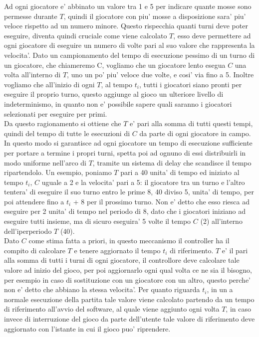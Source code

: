 Ad ogni giocatore e’ abbinato un valore tra 1 e 5 per indicare quante mosse sono permesse durante $T$, quindi il giocatore con piu’ mosse a disposizione sara’ piu’ veloce rispetto ad un numero minore. Questo rispecchia quanti turni deve poter eseguire, diventa quindi cruciale come viene calcolato $T$, esso deve permettere ad ogni giocatore di eseguire un numero di volte pari al suo valore che rappresenta la velocita’. Dato un campionamento del tempo di esecuzione pessimo di un turno di un giocatore, che chiameremo C, vogliamo che un giocatore lento esegua $C$ una volta all’interno di $T$, uno un po’ piu’ veloce due volte, e cosi’ via fino a 5. Inoltre vogliamo che all’inizio di ogni $T$, al tempo $t_i$, tutti i giocatori siano pronti per eseguire il proprio turno, questo aggiunge al gioco un ulteriore livello di indeterminismo, in quanto non e’ possibile sapere quali saranno i giocatori selezionati per eseguire per primi.\\

Da questo ragionamento si ottiene che $T$ e’ pari alla somma di tutti questi tempi, quindi del tempo di tutte le esecuzioni di $C$ da parte di ogni giocatore in campo. In questo modo si garantisce ad ogni giocatore un tempo di esecuzione sufficiente per portare a termine i propri turni, spetta poi ad ognuno di essi distribuirli in modo uniforme nell’arco di $T$, tramite un sistema di delay che scandisce il tempo ripartendolo. Un esempio, poniamo $T$ pari a 40 unita’ di tempo ed iniziato al tempo $t_i$, $C$ uguale a 2 e la velocita’ pari a 5: il giocatore tra un turno e l’altro tentera’ di eseguire il suo turno entro le prime 8, 40 diviso 5, unita’ di tempo, per poi attendere fino a $t_i$ + 8 per il prossimo turno. Non e’ detto che esso riesca ad eseguire per 2 unita’ di tempo nel periodo di 8, dato che i giocatori iniziano ad eseguire tutti insieme, ma di sicuro eseguira’ 5 volte il tempo $C$ (2) all’interno dell’iperperiodo $T$ (40).\\

Dato $C$ come stima fatta a priori, in questo meccanismo il controller ha il compito di calcolare $T$ e tenere aggiornato il tempo $t_i$ di riferimento. $T$ e’ il pari alla somma di tutti i turni di ogni giocatore, il controllore deve calcolare tale valore ad inizio del gioco, per poi aggiornarlo ogni qual volta ce ne sia il bisogno, per esempio in caso di sostituzione con un giocatore con un altro, questo perche’ non e’ detto che abbiano la stessa velocita’. Per quanto riguarda $t_i$, in un
a normale esecuzione della partita tale valore viene calcolato partendo da un tempo di riferimento all’avvio del software, al quale viene aggiunto ogni volta $T$, in caso invece di interruzione del gioco da parte dell’utente tale valore di riferimento deve aggiornato con l’istante in cui il gioco puo’ riprendere.

